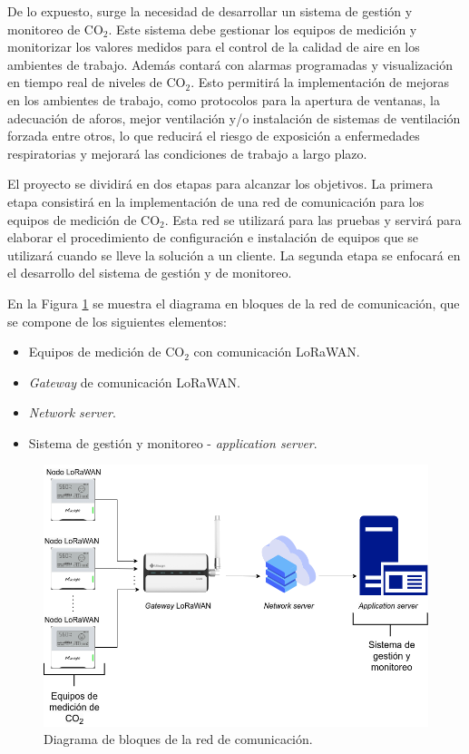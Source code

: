 \documentclass[
11pt, %
]{charter}
\begin{document}
De lo expuesto, surge la necesidad de desarrollar un sistema de gestión y monitoreo de CO$_{2}$. Este sistema debe gestionar los equipos de medición y monitorizar los valores medidos para el control de la calidad de aire en los ambientes de trabajo. Además contará con alarmas programadas y visualización en tiempo real de niveles de CO$_{2}$. Esto permitirá la implementación de mejoras en los ambientes de trabajo, como protocolos para la apertura de ventanas, la adecuación de aforos, mejor ventilación y/o instalación de sistemas de ventilación forzada entre otros, lo que reducirá el riesgo de exposición a enfermedades respiratorias y mejorará las condiciones de trabajo a largo plazo.

El proyecto se dividirá en dos etapas para alcanzar los objetivos. La primera etapa consistirá en la implementación de una red de comunicación para los equipos de medición de CO$_{2}$. Esta red se utilizará para las pruebas y servirá para elaborar el procedimiento de configuración e instalación de equipos que se utilizará cuando se lleve la solución a un cliente. La segunda etapa se enfocará en el desarrollo del sistema de gestión y de monitoreo.

En la Figura \ref{fig:diagBloque1} se muestra el diagrama en bloques de la red de comunicación, que se compone de los siguientes elementos:

\begin{itemize}
	\item Equipos de medición de CO$_{2}$ con comunicación LoRaWAN.
	\item \textit{Gateway} de comunicación LoRaWAN.
	\item \textit{Network server}.
	\item Sistema de gestión y monitoreo - \textit{application server}.
\end{itemize}

\begin{figure}[htpb]
\centering 
\includegraphics[width=.9\textwidth]{./Figuras/diagBloque1.png}
\caption{Diagrama de bloques de la red de comunicación.}
\label{fig:diagBloque1}
\end{figure}
\vspace{25px}
\end{document}
